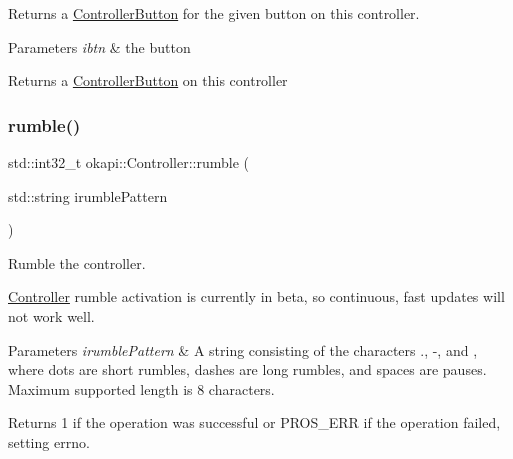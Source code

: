 Returns a \mbox{\hyperlink{classokapi_1_1ControllerButton}{Controller\+Button}} for the given button on this controller.


\begin{DoxyParams}{Parameters}
{\em ibtn} & the button \\
\hline
\end{DoxyParams}
\begin{DoxyReturn}{Returns}
a \mbox{\hyperlink{classokapi_1_1ControllerButton}{Controller\+Button}} on this controller 
\end{DoxyReturn}
\mbox{\label{classokapi_1_1Controller_afd0897a60a74e0a47cd352cf92d573e3}} 
\subsubsection{\texorpdfstring{rumble()}{rumble()}}
{\footnotesize\ttfamily std\+::int32\+\_\+t okapi\+::\+Controller\+::rumble (\begin{DoxyParamCaption}\item[{std\+::string}]{irumble\+Pattern }\end{DoxyParamCaption})\hspace{0.3cm}{\ttfamily [virtual]}}

Rumble the controller.

\mbox{\hyperlink{classokapi_1_1Controller}{Controller}} rumble activation is currently in beta, so continuous, fast updates will not work well.


\begin{DoxyParams}{Parameters}
{\em irumble\+Pattern} & A string consisting of the characters \textquotesingle{}.\textquotesingle{}, \textquotesingle{}-\/\textquotesingle{}, and \textquotesingle{} \textquotesingle{}, where dots are short rumbles, dashes are long rumbles, and spaces are pauses. Maximum supported length is 8 characters.\\
\hline
\end{DoxyParams}
\begin{DoxyReturn}{Returns}
1 if the operation was successful or P\+R\+O\+S\+\_\+\+E\+RR if the operation failed, setting errno. 
\end{DoxyReturn}
\mbox{\label{classokapi_1_1Controller_a91494385d809ca1f2c633ec231c44e07}} 
